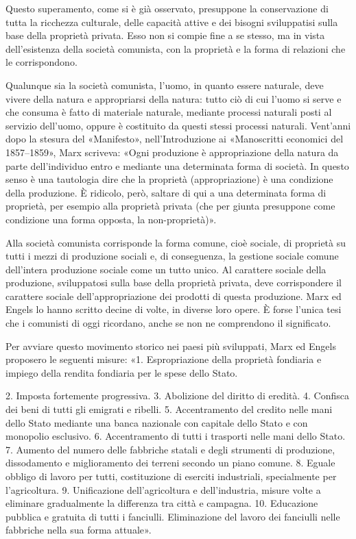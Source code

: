 \documentclass[../main]{subfiles}
\begin{document}
Questo superamento, come si è già osservato, presuppone la conservazione di tutta la ricchezza culturale, delle capacità attive e dei bisogni sviluppatisi sulla base della proprietà privata. Esso non si compie fine a se stesso, ma in vista dell'esistenza della società comunista, con la proprietà e la forma di relazioni che le corrispondono.

Qualunque sia la società comunista, l'uomo, in quanto essere naturale, deve vivere della natura e appropriarsi della natura: tutto ciò di cui l'uomo si serve e che consuma è fatto di materiale naturale, mediante processi naturali posti al servizio dell'uomo, oppure è costituito da questi stessi processi naturali. Vent'anni dopo la stesura del «Manifesto», nell'Introduzione ai «Manoscritti economici del 1857–1859», Marx scriveva: «Ogni produzione è appropriazione della natura da parte dell'individuo entro e mediante una determinata forma di società. In questo senso è una tautologia dire che la proprietà (appropriazione) è una condizione della produzione. È ridicolo, però, saltare di qui a una determinata forma di proprietà, per esempio alla proprietà privata (che per giunta presuppone come condizione una forma opposta, la non-proprietà)».

Alla società comunista corrisponde la forma comune, cioè sociale, di proprietà su tutti i mezzi di produzione sociali e, di conseguenza, la gestione sociale comune dell'intera produzione sociale come un tutto unico. Al carattere sociale della produzione, sviluppatosi sulla base della proprietà privata, deve corrispondere il carattere sociale dell'appropriazione dei prodotti di questa produzione. Marx ed Engels lo hanno scritto decine di volte, in diverse loro opere. È forse l'unica tesi che i comunisti di oggi ricordano, anche se non ne comprendono il significato.

Per avviare questo movimento storico nei paesi più sviluppati, Marx ed Engels proposero le seguenti misure: «1. Espropriazione della proprietà fondiaria e impiego della rendita fondiaria per le spese dello Stato.

2. Imposta fortemente progressiva. 3. Abolizione del diritto di eredità. 4. Confisca dei beni di tutti gli emigrati e ribelli. 5. Accentramento del credito nelle mani dello Stato mediante una banca nazionale con capitale dello Stato e con monopolio esclusivo. 6. Accentramento di tutti i trasporti nelle mani dello Stato. 7. Aumento del numero delle fabbriche statali e degli strumenti di produzione, dissodamento e miglioramento dei terreni secondo un piano comune. 8. Eguale obbligo di lavoro per tutti, costituzione di eserciti industriali, specialmente per l'agricoltura. 9. Unificazione dell'agricoltura e dell'industria, misure volte a eliminare gradualmente la differenza tra città e campagna. 10. Educazione pubblica e gratuita di tutti i fanciulli. Eliminazione del lavoro dei fanciulli nelle fabbriche nella sua forma attuale».
\end{document}
